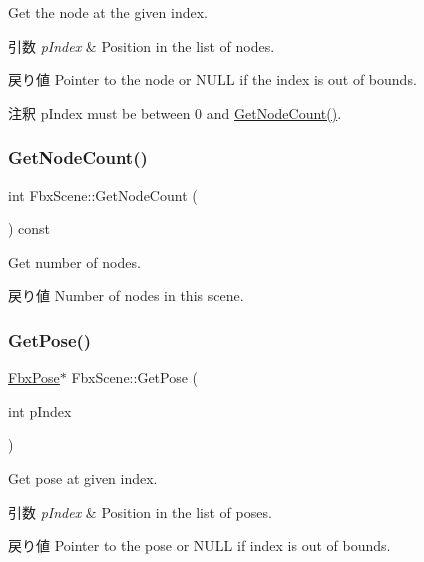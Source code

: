 Get the node at the given index. 
\begin{DoxyParams}{引数}
{\em p\+Index} & Position in the list of nodes. \\
\hline
\end{DoxyParams}
\begin{DoxyReturn}{戻り値}
Pointer to the node or {\ttfamily N\+U\+LL} if the index is out of bounds. 
\end{DoxyReturn}
\begin{DoxyRemark}{注釈}
p\+Index must be between 0 and \hyperlink{class_fbx_scene_a0cb1a1464b0fa1b8291c41900879515e}{Get\+Node\+Count()}. 
\end{DoxyRemark}
\mbox{\label{class_fbx_scene_a0cb1a1464b0fa1b8291c41900879515e}} 
\subsubsection{\texorpdfstring{Get\+Node\+Count()}{GetNodeCount()}}
{\footnotesize\ttfamily int Fbx\+Scene\+::\+Get\+Node\+Count (\begin{DoxyParamCaption}{ }\end{DoxyParamCaption}) const}

Get number of nodes. \begin{DoxyReturn}{戻り値}
Number of nodes in this scene. 
\end{DoxyReturn}
\mbox{\label{class_fbx_scene_a9148979d7728e7256be7ce52cb100558}} 
\subsubsection{\texorpdfstring{Get\+Pose()}{GetPose()}}
{\footnotesize\ttfamily \hyperlink{class_fbx_pose}{Fbx\+Pose}$\ast$ Fbx\+Scene\+::\+Get\+Pose (\begin{DoxyParamCaption}\item[{int}]{p\+Index }\end{DoxyParamCaption})}

Get pose at given index. 
\begin{DoxyParams}{引数}
{\em p\+Index} & Position in the list of poses. \\
\hline
\end{DoxyParams}
\begin{DoxyReturn}{戻り値}
Pointer to the pose or {\ttfamily N\+U\+LL} if index is out of bounds. 
\end{DoxyReturn}
\mbox{\label{class_fbx_scene_a0bfae5c6b969cfc49a7b0e3c9e190240}} 
